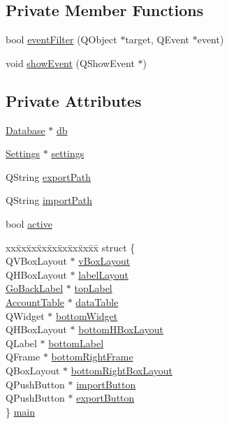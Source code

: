\subsection*{Private Member Functions}
\begin{CompactItemize}
\item 
bool \hyperlink{classAccountStack_d0}{event\-Filter} (QObject $\ast$target, QEvent $\ast$event)
\item 
void \hyperlink{classAccountStack_d1}{show\-Event} (QShow\-Event $\ast$)
\end{CompactItemize}
\subsection*{Private Attributes}
\begin{CompactItemize}
\item 
\hyperlink{classDatabase}{Database} $\ast$ \hyperlink{classAccountStack_r0}{db}
\item 
\hyperlink{classSettings}{Settings} $\ast$ \hyperlink{classAccountStack_r1}{settings}
\item 
QString \hyperlink{classAccountStack_r2}{export\-Path}
\item 
QString \hyperlink{classAccountStack_r3}{import\-Path}
\item 
bool \hyperlink{classAccountStack_r4}{active}
\item 
\begin{tabbing}
xx\=xx\=xx\=xx\=xx\=xx\=xx\=xx\=xx\=\kill
struct \{\\
\>QVBoxLayout $\ast$ \hyperlink{classAccountStack_r5}{vBoxLayout}\\
\>QHBoxLayout $\ast$ \hyperlink{classAccountStack_r6}{labelLayout}\\
\>\hyperlink{classGoBackLabel}{GoBackLabel} $\ast$ \hyperlink{classAccountStack_r7}{topLabel}\\
\>\hyperlink{classAccountTable}{AccountTable} $\ast$ \hyperlink{classAccountStack_r8}{dataTable}\\
\>QWidget $\ast$ \hyperlink{classAccountStack_r9}{bottomWidget}\\
\>QHBoxLayout $\ast$ \hyperlink{classAccountStack_r10}{bottomHBoxLayout}\\
\>QLabel $\ast$ \hyperlink{classAccountStack_r11}{bottomLabel}\\
\>QFrame $\ast$ \hyperlink{classAccountStack_r12}{bottomRightFrame}\\
\>QBoxLayout $\ast$ \hyperlink{classAccountStack_r13}{bottomRightBoxLayout}\\
\>QPushButton $\ast$ \hyperlink{classAccountStack_r14}{importButton}\\
\>QPushButton $\ast$ \hyperlink{classAccountStack_r15}{exportButton}\\
\} \hyperlink{classAccountStack_r16}{main}\\

\end{tabbing}\end{CompactItemize}



